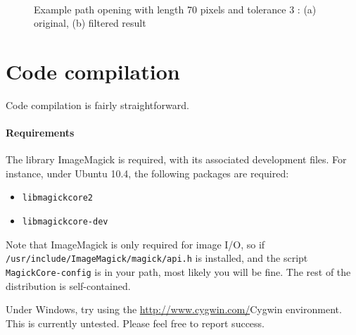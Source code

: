 \documentclass[11pt]{article}
\begin{document}
\begin{figure}
\centering
{}\\
\caption{Example path opening with length 70 pixels and tolerance 3 : (a) original, (b) filtered result}
\end{figure}

\section{Code compilation}
Code compilation is fairly straightforward. 

\paragraph{Requirements}
The library {\sc ImageMagick} is
required, with its associated development files. For instance, under Ubuntu
10.4, the following packages are required:

\begin{itemize}
\item {\tt libmagickcore2}
\item {\tt libmagickcore-dev}
\end{itemize}

Note that ImageMagick is only required for image I/O, so if {\tt
  /usr/include/ImageMagick/magick/api.h} is installed, and the script {\tt
  MagickCore-config} is in your path, most likely you will be fine. The rest of
the distribution is self-contained.

Under Windows, try using the \url{http://www.cygwin.com/}{Cygwin}
environment. This is currently untested. Please feel free to report success.
\end{document}
